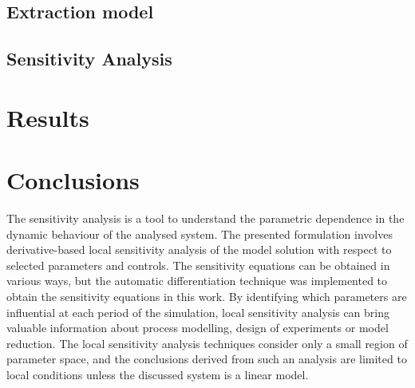 \documentclass[a4paper,fleqn]{cas-dc}
\begin{document}
\begin{comment}
	The low Mach number condition leads to the incompressible condition: $\nabla \cdot u =0$, which is valid for constant density (strict incompressible) or varying density flow. The restraint allows for the removal of acoustic waves, but also allows for large perturbations in density and/or temperature. The assumption is that the flow remains within a Mach number limit (usually less than 0.3) for any solution using such a constraint to be valid. In the 1-D case, the incompressibility condition becomes $\frac{du}{dz} = 0$, so the fluid velocity is constant.
	
\end{comment}

\subsection{Extraction model} \label{CH: Extraction_model}


%

\subsection{Sensitivity Analysis} \label{CH: Sensitivity_Analysis}


%

\section{Results}


\section{Conclusions} \label{CH: Conclusion}

The sensitivity analysis is a tool to understand the parametric dependence in the dynamic behaviour of the analysed system. The presented formulation involves derivative-based local sensitivity analysis of the model solution with respect to selected parameters and controls. The sensitivity equations can be obtained in various ways, but the automatic differentiation technique was implemented to obtain the sensitivity equations in this work. By identifying which parameters are influential at each period of the simulation, local sensitivity analysis can bring valuable information about process modelling, design of experiments or model reduction. The local sensitivity analysis techniques consider only a small region of parameter space, and the conclusions derived from such an analysis are limited to local conditions unless the discussed system is a linear model.
\end{document}
